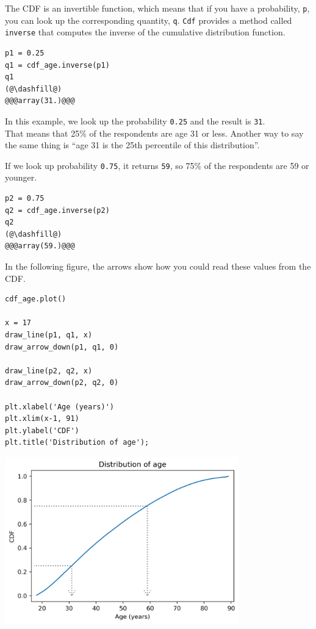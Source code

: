 The CDF is an invertible function, which means that if you have a
probability, \passthrough{\lstinline!p!}, you can look up the
corresponding quantity, \passthrough{\lstinline!q!}.
\passthrough{\lstinline!Cdf!} provides a method called
\passthrough{\lstinline!inverse!} that computes the inverse of the
cumulative distribution function.

\begin{lstlisting}[]
p1 = 0.25
q1 = cdf_age.inverse(p1)
q1
(@\dashfill@)
@@@array(31.)@@@
\end{lstlisting}

In this example, we look up the probability
\passthrough{\lstinline!0.25!} and the result is
\passthrough{\lstinline!31!}.\\
That means that 25\% of the respondents are age 31 or less. Another way
to say the same thing is ``age 31 is the 25th percentile of this
distribution''.

If we look up probability \passthrough{\lstinline!0.75!}, it returns
\passthrough{\lstinline!59!}, so 75\% of the respondents are 59 or
younger.

\begin{lstlisting}[]
p2 = 0.75
q2 = cdf_age.inverse(p2)
q2
(@\dashfill@)
@@@array(59.)@@@
\end{lstlisting}

In the following figure, the arrows show how you could read these values
from the CDF.

\begin{lstlisting}[]
cdf_age.plot()

x = 17
draw_line(p1, q1, x)
draw_arrow_down(p1, q1, 0)

draw_line(p2, q2, x)
draw_arrow_down(p2, q2, 0)

plt.xlabel('Age (years)')
plt.xlim(x-1, 91)
plt.ylabel('CDF')
plt.title('Distribution of age');
\end{lstlisting}

\begin{center}
\includegraphics[width=4in]{chapters/08_distributions_files/08_distributions_77_0.png}
\end{center}

